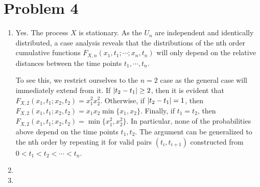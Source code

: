 \documentclass[12pt]{article}%
\begin{document}
\section{Problem 4}
\begin{enumerate}
  \item Yes. The process $X$ is stationary. As the $U_n$ are independent and identically distributed, a case analysis reveals that the distributions of the nth order cumulative functions $F_{X,n}(x_1,t_1;\cdots;x_n,t_n)$ will only depend on the relative distances between the time points $t_1,\cdots ,t_n$.

  To see this, we restrict ourselves to the $n=2$ case as the general case will immediately extend from it. If $\abs{t_2 - t_1} \geq 2$, then it is evident that $F_{X,2}(x_1,t_1 ; x_2, t_2) = x_1^2x_2^2$. Otherwise, if $\abs{t_2 - t_1} = 1$, then $F_{X,2}(x_1,t_1 ; x_2, t_2) = x_1x_2 \min\{x_1,x_2\}$. Finally, if $t_1 = t_2$, then $F_{X,2}(x_1,t_1 ; x_2, t_2) = \min\{x_1^2,x_2^2\}$. In particular, none of the probabilities above depend on the time points $t_1,t_2$. The argument can be generalized to the nth order by repeating it for valid pairs $(t_i, t_{i+1})$ constructed from $0 < t_1 < t_2 < \cdots < t_n$.


  \item

  \item

\end{enumerate}
\end{document}
